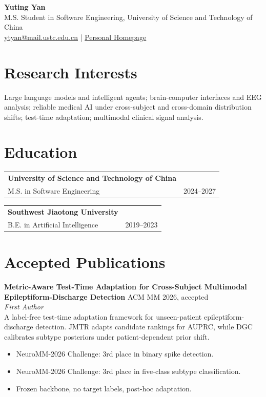 \documentclass[10pt,letterpaper]{article}
\makeatletter
\newcommand{\cvitem}[2]{
  \begin{tabularx}{\textwidth}{@{}X r@{}}
    #1 & {\color{textgray}#2}
  \end{tabularx}
}
\newcommand{\paper}[5]{
  \textbf{#1} \hfill {\color{textgray}#2}\\
  {\itshape #3}\\
  #4
  \begin{itemize}
    #5
  \end{itemize}
}
\makeatother
\begin{document}
\begin{center}
  {\LARGE \textbf{Yuting Yan}}\\
  \vspace{4pt}
  M.S. Student in Software Engineering, University of Science and Technology of China\\
  \vspace{4pt}
  \href{mailto:ytyan@mail.ustc.edu.cn}{ytyan@mail.ustc.edu.cn}
  \quad | \quad
  \href{https://ytyan-bot.github.io/ytyan.github.io/}{Personal Homepage}
\end{center}

\section{Research Interests}
Large language models and intelligent agents; brain-computer interfaces and EEG analysis; reliable medical AI under cross-subject and cross-domain distribution shifts; test-time adaptation; multimodal clinical signal analysis.

\section{Education}
\cvitem{\textbf{University of Science and Technology of China}\\
M.S. in Software Engineering}{2024--2027}
\vspace{6pt}

\cvitem{\textbf{Southwest Jiaotong University}\\
B.E. in Artificial Intelligence}{2019--2023}

\section{Accepted Publications}
\paper
  {Metric-Aware Test-Time Adaptation for Cross-Subject Multimodal Epileptiform-Discharge Detection}
  {ACM MM 2026, accepted}
  {First Author}
  {A label-free test-time adaptation framework for unseen-patient epileptiform-discharge detection. JMTR adapts candidate rankings for AUPRC, while DGC calibrates subtype posteriors under patient-dependent prior shift.}
  {
    \item NeuroMM-2026 Challenge: 3rd place in binary spike detection.
    \item NeuroMM-2026 Challenge: 3rd place in five-class subtype classification.
    \item Frozen backbone, no target labels, post-hoc adaptation.
  }
\end{document}
